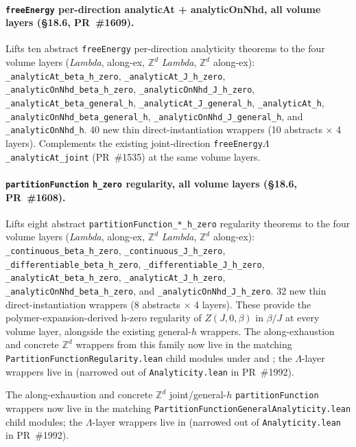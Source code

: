 \documentclass[a4paper,11pt]{article}
\newcommand{\LeanLambda}{\texorpdfstring{\ensuremath{\Lambda}}{Lambda}}
\begin{document}
\paragraph{\texttt{freeEnergy} per-direction analyticAt +
analyticOnNhd, all volume layers (\S18.6, PR~\#1609).} Lifts
ten abstract \texttt{freeEnergy} per-direction analyticity
theorems to the four volume layers (\textit{Lambda}, along-ex,
$\mathbb{Z}^d$ \textit{Lambda}, $\mathbb{Z}^d$ along-ex):
\texttt{\_analyticAt\_beta\_h\_zero},
\texttt{\_analyticAt\_J\_h\_zero},
\texttt{\_analyticOnNhd\_beta\_h\_zero},
\texttt{\_analyticOnNhd\_J\_h\_zero},
\texttt{\_analyticAt\_beta\_general\_h},
\texttt{\_analyticAt\_J\_general\_h},
\texttt{\_analyticAt\_h},
\texttt{\_analyticOnNhd\_beta\_general\_h},
\texttt{\_analyticOnNhd\_J\_general\_h}, and
\texttt{\_analyticOnNhd\_h}. 40 new thin
direct-instantiation wrappers (10 abstracts $\times$ 4 layers).
Complements the existing joint-direction
\texttt{freeEnergy\LeanLambda\_analyticAt\_joint} (PR~\#1535) at the same
volume layers.

\paragraph{\texttt{partitionFunction} \texttt{h\_zero} regularity,
all volume layers (\S18.6, PR~\#1608).} Lifts eight abstract
\texttt{partitionFunction\_*\_h\_zero} regularity theorems to the
four volume layers (\textit{Lambda}, along-ex, $\mathbb{Z}^d$
\textit{Lambda}, $\mathbb{Z}^d$ along-ex):
\texttt{\_continuous\_beta\_h\_zero},
\texttt{\_continuous\_J\_h\_zero},
\texttt{\_differentiable\_beta\_h\_zero},
\texttt{\_differentiable\_J\_h\_zero},
\texttt{\_analyticAt\_beta\_h\_zero},
\texttt{\_analyticAt\_J\_h\_zero},
\texttt{\_analyticOnNhd\_beta\_h\_zero}, and
\texttt{\_analyticOnNhd\_J\_h\_zero}. 32 new thin
direct-instantiation wrappers (8 abstracts $\times$ 4 layers).
These provide the polymer-expansion-derived h-zero regularity of
$Z(J, 0, \beta)$ in $\beta / J$ at every volume layer, alongside
the existing general-$h$ wrappers. The along-exhaustion and concrete
$\mathbb{Z}^d$ wrappers from this family now live in the matching
\texttt{PartitionFunctionRegularity.lean} child modules under
 and
; the $\Lambda$-layer wrappers
live in
(narrowed out of \texttt{Analyticity.lean} in PR~\#1992).

The along-exhaustion and concrete $\mathbb{Z}^d$ joint/general-$h$
\texttt{partitionFunction} wrappers now live in the matching
\texttt{PartitionFunctionGeneralAnalyticity.lean} child modules; the
$\Lambda$-layer wrappers live in
(narrowed out of \texttt{Analyticity.lean} in PR~\#1992).
\end{document}
